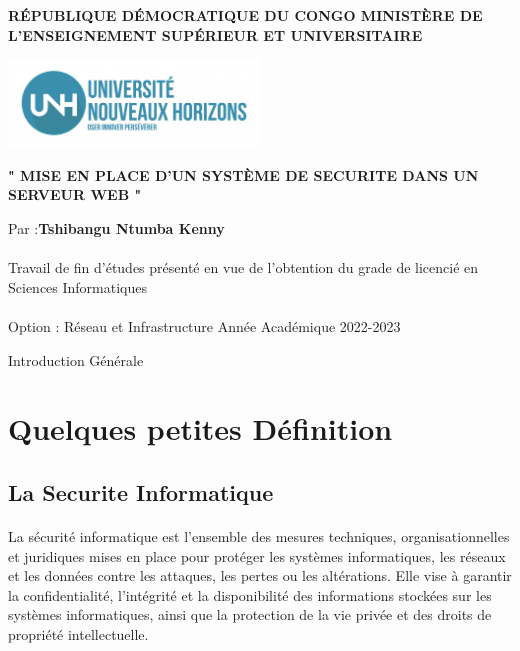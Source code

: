 \documentclass{report}
\begin{document}
	\author{Tshibangu Ntumba Kenny}
	
	\begin{titlepage}
		
		\centering
		
		\textbf{\Large RÉPUBLIQUE DÉMOCRATIQUE DU CONGO
			MINISTÈRE DE L’ENSEIGNEMENT SUPÉRIEUR ET UNIVERSITAIRE}
		\vspace{1.5cm}
		 
		 \includegraphics[width=0.5\textwidth]{Logo.jpg}
		 \vspace{3.5cm}
		 
		 
		 \textbf{\Large "  MISE EN PLACE D'UN SYSTÈME DE SECURITE DANS UN SERVEUR WEB "}
		 \vspace{2.5cm}
		 
		  \large Par :\textbf{Tshibangu Ntumba Kenny} 
		  
		  \paragraph{ } Travail de fin d’études présenté en vue de l’obtention
		  du grade de licencié en Sciences Informatiques
		\paragraph{ } \Large{ Option : Réseau et Infrastructure}
		 \vfill
		 {\LARGE Année Académique 2022-2023}
	\end{titlepage}
\begin{center}
\tableofcontents
\pagebreak
\end{center}
	    
	\begin{Huge}
	Introduction Générale
	\end{Huge}
	 
 \section{ Quelques petites Définition}
 \subsection{La Securite Informatique }
 
 
 \paragraph{ }  La sécurité informatique est l'ensemble des mesures techniques, organisationnelles et juridiques mises en place pour protéger les systèmes informatiques, les réseaux et les données contre les attaques, les pertes ou les altérations. Elle vise à garantir la confidentialité, l'intégrité et la disponibilité des informations stockées sur les systèmes informatiques, ainsi que la protection de la vie privée et des droits de propriété intellectuelle.  
 
\end{document}
